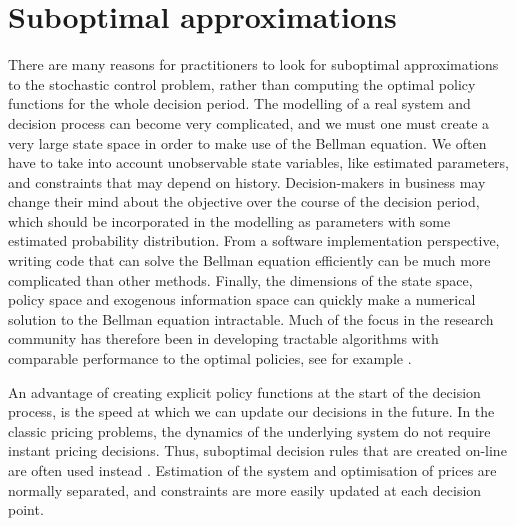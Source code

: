 \documentclass[main.tex]{subfiles}
\begin{document}



\listoftodos

\section{Suboptimal approximations}
There are many reasons for practitioners to look for suboptimal
approximations to the stochastic control problem, rather than
computing the optimal policy functions for the whole decision period.
The modelling of a real system and decision process can become very
complicated, and  we must one must create a very
large state space in order to make use of the Bellman equation.
We often have to take into account unobservable
state variables, like estimated parameters, and constraints that may
depend on history. Decision-makers in business may change their mind
about the objective over the course of the decision period, which should
be incorporated in the modelling as parameters with some estimated
probability distribution.
From a software implementation perspective, writing code that can
solve the Bellman equation efficiently can be much more complicated
than other methods.
Finally, the dimensions of the state space, policy space and exogenous
information space can quickly make a numerical solution to the Bellman
equation intractable.
Much of the focus in the research community has therefore been in
developing tractable algorithms with comparable performance to the
optimal policies, see for example
\citep{powell2011approximate,bertsekas2012dynamic}.

An advantage of creating explicit policy functions at the start of the decision
process, is the speed at which we can update our decisions in the
future. In the classic pricing problems, the dynamics of the
underlying system do not require instant pricing decisions. Thus,
suboptimal decision rules that are created on-line are often used
instead \citep{talluri2006theory}. Estimation of the system and optimisation of prices are
normally separated, and constraints are more easily updated at each
decision point.
\end{document}
